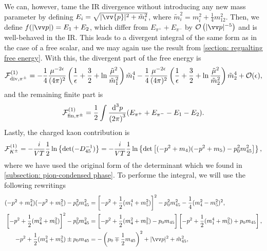 We can, however, tame the IR divergence without introducing any new mass parameter by defining $E_i = \sqrt{|\vv{p}|^2 + \tilde m_i^2}$, where $\tilde m_i^2 = m_i^2 + \frac{1}{4} m_{12}^2$.
Then, we define $f(|\vv p|) = E_1 + E_2$, which differ from $E_{\pi^+} + E_{\pi^-}$ by $\Oh\left(|\vv p|^{-5}\right)$ and is well-behaved in the IR.
This leads to a divergent integral of the same form as in the case of a free scalar, and we may again use the result from \autoref{section: regualting free energy}.
With this, the divergent part of the free energy is
%
\begin{equation}
    \mathcal{F}^{(1)}_{\mathrm{div}, {\pi^\pm} }
    =
    - \frac{1}{4} \frac{\mu^{-2 \epsilon}}{(4\pi)^2} 
    \left(
        \frac{1}{\epsilon} + \frac{3}{2} + \ln \frac{\tilde \mu^2}{\tilde m_1^2}
    \right) \tilde m_1^4
    - \frac{1}{4} \frac{\mu^{-2 \epsilon}}{(4\pi)^2} 
    \left(
        \frac{1}{\epsilon} + \frac{3}{2} + \ln \frac{\tilde \mu^2}{\tilde m_2^2}
    \right) \tilde m_2^4
    + \mathcal{O}(\epsilon),
\end{equation}
%
and the remaining finite part is
%
\begin{equation}
    \mathcal{F}^{(1)}_{\mathrm{fin}, {\pi^\pm}}
    = 
    \frac{1}{2} \int \frac{\text{d}^3 p}{{(2\pi)}^3} (E_{\pi^+} + E_{\pi^-} - E_1 - E_2).
\end{equation}
%
Lastly, the charged kaon contribution is
%
\begin{equation}
    \mathcal{F}^{(1)}_{{K^\pm}}
    =
    -\frac{i}{VT}\frac{1}{2}
    \ln\left\{ 
        \det(-D_{45}^{-1})
    \right\}
    =
    -\frac{i}{VT}\frac{1}{2}
    \ln\left\{ 
        \det\left[(- p^2 + m_4)(- p^2 + m_5) - p_0^2m_{45}^2\right]
    \right\},
\end{equation}
%
where we have used the original form of the determinant which we found in \autoref{subsection: pion-condensed phase}.
To performe the integral, we will use the following rewritings
%
\begin{align}
    (-p^2 + m_4^2)(-p^2 + m_5^2) - p_0^2 m_{45}^2
    &
    = \left[-p^2 + \frac{1}{2}(m_1^4 + m_5^2)\right]^2 
    - p_0^2 m_{45}^2 - \frac{1}{4}(m_4^2 - m_5^2)^2, \\
    \left[-p^2 + \frac{1}{2}(m_4^2 + m_5^2)\right]^2 - p_0^2 m_{45}^2
    &
    = \left[-p^2 + \frac{1}{2}(m_4^2 + m_5^2) - p_0 m_{45} \right]
    \left[-p^2 + \frac{1}{2}(m_1^4 + m_5^2) + p_0 m_{45} \right], \\
    - p^2 + \frac{1}{2}(m_4^2 + m_5^2) \pm p_0 m_{45}
    &= - \left(p_0 \mp \frac{1}{2}m_{45}\right)^2 + |\vv p|^2 
    + 
    \tilde m_{45}^2, 
\end{align}
